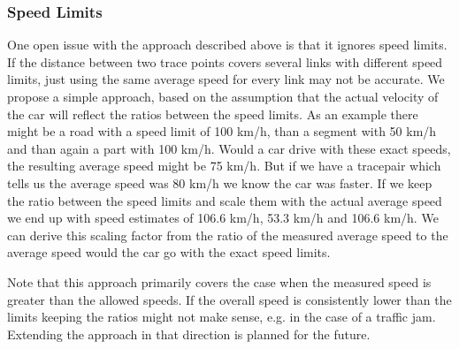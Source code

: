 \documentclass{scrartcl}
\begin{document}
\subsubsection{Speed Limits}

One open issue with the approach described above is that it ignores speed limits.
If the distance between two trace points covers several links with different speed limits, just using the same average speed for every link may not be accurate.
We propose a simple approach, based on the assumption that the actual velocity of the car will reflect the ratios between the speed limits.
As an example there might be a road with a speed limit of 100 km/h, than a segment with 50 km/h and than again a part with 100 km/h.
Would a car drive with these exact speeds, the resulting average speed might be 75 km/h.
But if we have a tracepair which tells us the average speed was 80 km/h we know the car was faster.
If we keep the ratio between the speed limits and scale them with the actual average speed we end up with speed estimates of 106.6 km/h, 53.3 km/h and 106.6 km/h.
We can derive this scaling factor from the ratio of the measured average speed to the average speed would the car go with the exact speed limits.

Note that this approach primarily covers the case when the measured speed is greater than the allowed speeds.
If the overall speed is consistently lower than the limits keeping the ratios might not make sense, e.g. in the case of a traffic jam.
Extending the approach in that direction is planned for the future.

\end{document}
